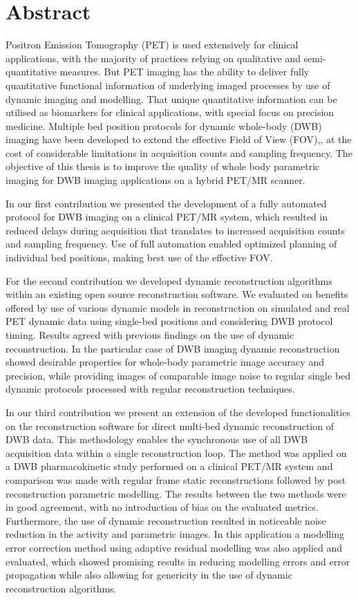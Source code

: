 \section*{Abstract}
Positron Emission Tomography (PET) is used extensively for clinical applications, with the majority of practices relying on qualitative and semi-quantitative measures. But PET imaging has the ability to deliver fully quantitative functional information of underlying imaged processes by use of dynamic imaging and modelling. That unique quantitative information can be utilised as biomarkers for clinical applications, with special focus on precision medicine. Multiple bed position protocols for dynamic whole-body (DWB) imaging have been developed to extend the effective Field of View (FOV),, at the cost of considerable limitations in acquisition counts and sampling frequency. The objective of this thesis is to improve the quality of whole body parametric imaging for DWB imaging applications on a hybrid PET/MR scanner.

In our first contribution we presented the development of a fully automated protocol for DWB imaging on a clinical PET/MR system, which resulted in reduced delays during acquisition that translates to increased acquisition counts and sampling frequency. Use of full automation enabled optimized planning of individual bed positions, making best use of the effective FOV. 

For the second contribution we developed dynamic reconstruction algorithms within an existing open source reconstruction software. We evaluated on benefits offered by use of various dynamic models in reconstruction on simulated and real PET dynamic data using single-bed positions and considering DWB protocol timing.
Results agreed with previous findings on the use of dynamic reconstruction. In the particular case of DWB imaging dynamic reconstruction showed desirable properties for whole-body parametric image accuracy and precision, while providing images of comparable image noise to regular single bed dynamic protocols processed with regular reconstruction techniques.

In our third contribution we present an extension of the developed functionalities on the reconstruction software for direct multi-bed dynamic reconstruction of DWB data. This methodology enables the synchronous use of all DWB acquisition data within a single reconstruction loop. The method was applied on a DWB pharmacokinetic study performed on a clinical PET/MR system and comparison was made with regular frame static reconstructions followed by post reconstruction parametric modelling. The results between the two methods were in good agreement, with no introduction of bias on the evaluated metrics. Furthermore, the use of dynamic reconstruction resulted in noticeable noise reduction in the activity and parametric images. In this application a modelling error correction method using adaptive residual modelling was also applied and evaluated, which showed promising results in reducing modelling errors and error propagation while also allowing for genericity in the use of dynamic reconstruction algorithms.

